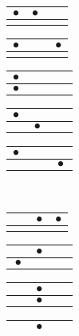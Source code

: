 \begin{center}
\vspace{-0.5em}
\begin{tabular}{|c|c|c|}
\hline
$\bullet$ & $\bullet$ & $\phantom{\bullet}$ \\ \hline
 &  &  \\
\hline
\end{tabular}
\begin{tabular}{|c|c|c|}
\hline
$\bullet$ & $\phantom{\bullet}$ & $\bullet$ \\ \hline
 &  &  \\
\hline
\end{tabular}
\begin{tabular}{|c|c|c|}
\hline
$\bullet$ & $\phantom{\bullet}$ & $\phantom{\bullet}$ \\ \hline
$\bullet$ &  &  \\
\hline
\end{tabular}
\begin{tabular}{|c|c|c|}
\hline
$\bullet$ & $\phantom{\bullet}$ & $\phantom{\bullet}$ \\ \hline
 & $\bullet$ &  \\
\hline
\end{tabular}
\begin{tabular}{|c|c|c|}
\hline
$\bullet$ & $\phantom{\bullet}$ & $\phantom{\bullet}$ \\ \hline
 &  & $\bullet$ \\
\hline
\end{tabular} \\
\vspace{0.5em}
\begin{tabular}{|c|c|c|}
\hline
$\phantom{\bullet}$ & $\bullet$ & $\bullet$ \\ \hline
 &  &  \\
\hline
\end{tabular}
\begin{tabular}{|c|c|c|}
\hline
$\phantom{\bullet}$ & $\bullet$ & $\phantom{\bullet}$ \\ \hline
$\bullet$ &  &  \\
\hline
\end{tabular}
\begin{tabular}{|c|c|c|}
\hline
$\phantom{\bullet}$ & $\bullet$ & $\phantom{\bullet}$ \\ \hline
 & $\bullet$ &  \\
\hline
\end{tabular}
\begin{tabular}{|c|c|c|}
\hline
$\phantom{\bullet}$ & $\bullet$ & $\phantom{\bullet}$ \\ \hline

\end{tabular}
\end{center}

